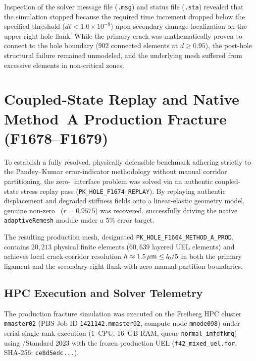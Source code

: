 Inspection of the solver message file (\texttt{.msg}) and status file (\texttt{.sta}) revealed that the simulation stopped because the required time increment dropped below the specified threshold ($dt < 1.0 \times 10^{-8}$) upon secondary damage localization on the upper-right hole flank. While the primary crack was mathematically proven to connect to the hole boundary ($902$ connected elements at $d \ge 0.95$), the post-hole structural failure remained unmodeled, and the underlying mesh suffered from excessive elements in non-critical zones.

\section{Coupled-State Replay and Native Method~A Production Fracture (F1678--F1679)}
\label{sec:hole_f1678_production}

To establish a fully resolved, physically defensible benchmark adhering strictly to the Pandey--Kumar error-indicator methodology without manual corridor partitioning, the zero-\MISESERI\ interface problem was solved via an authentic coupled-state stress replay pass (\texttt{PK\_HOLE\_F1674\_REPLAY}). By replaying authentic displacement and degraded stiffness fields onto a linear-elastic geometry model, genuine non-zero \MISESERI\ ($r = 0.9575$) was recovered, successfully driving the native \Abaqus \texttt{adaptiveRemesh} module under a $5\%$ error target.

The resulting production mesh, designated \texttt{PK\_HOLE\_F1664\_METHOD\_A\_PROD}, contains $20{,}213$ physical finite elements ($60{,}639$ layered UEL elements) and achieves local crack-corridor resolution $h \approx 1.5\,\mu\mathrm{m} \le l_0 / 5$ in both the primary ligament and the secondary right flank with zero manual partition boundaries.

\subsection{HPC Execution and Solver Telemetry}
\label{subsec:hole_prod_telemetry}

The production fracture simulation was executed on the Freiberg HPC cluster \texttt{mmaster02} (PBS Job ID \texttt{1421142.mmaster02}, compute node \texttt{mnode098}) under serial single-rank execution (1~CPU, 16~GB RAM, queue \texttt{normal\_imfdfkmq}) using \Abaqus/Standard 2023 with the frozen production UEL (\texttt{f42\_mixed\_uel.for}, SHA-256: \texttt{ce8d5edc...}).

